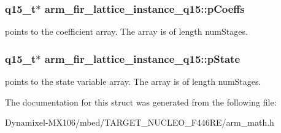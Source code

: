 \subsubsection[{\texorpdfstring{p\+Coeffs}{pCoeffs}}]{\setlength{\rightskip}{0pt plus 5cm}q15\+\_\+t$\ast$ arm\+\_\+fir\+\_\+lattice\+\_\+instance\+\_\+q15\+::p\+Coeffs}\hypertarget{structarm__fir__lattice__instance__q15_a78f872826140069cf67836fff87360bc}{}\label{structarm__fir__lattice__instance__q15_a78f872826140069cf67836fff87360bc}
points to the coefficient array. The array is of length num\+Stages. 
\subsubsection[{\texorpdfstring{p\+State}{pState}}]{\setlength{\rightskip}{0pt plus 5cm}q15\+\_\+t$\ast$ arm\+\_\+fir\+\_\+lattice\+\_\+instance\+\_\+q15\+::p\+State}\hypertarget{structarm__fir__lattice__instance__q15_a37b90dea2bc3ee7c9951a9fe74db0cbb}{}\label{structarm__fir__lattice__instance__q15_a37b90dea2bc3ee7c9951a9fe74db0cbb}
points to the state variable array. The array is of length num\+Stages. 

The documentation for this struct was generated from the following file\+:\begin{DoxyCompactItemize}
\item 
Dynamixel-\/\+M\+X106/mbed/\+T\+A\+R\+G\+E\+T\+\_\+\+N\+U\+C\+L\+E\+O\+\_\+\+F446\+R\+E/arm\+\_\+math.\+h\end{DoxyCompactItemize}
